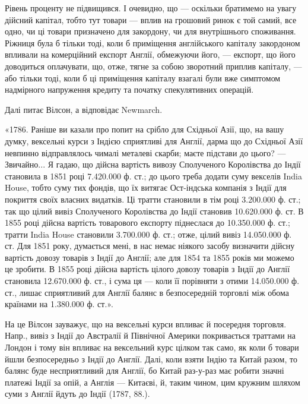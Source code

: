 \parcont{}  %
Рівень проценту не підвищився. І очевидно, що — оскільки братимемо на увагу
дійсний капітал, тобто тут товари — вплив на грошовий ринок є той самий,
все одно, чи ці товари призначено для закордону, чи для внутрішнього споживання.
Ріжниця була б тільки тоді, коли б приміщення англійського капіталу
закордоном впливали на комерційний експорт Англії, обмежуючи його, — експорт,
що його доводиться оплачувати, що, отже, тягне за собою зворотний приплив
капіталу, — або тільки тоді, коли б ці приміщення капіталу взагалі були вже
симптомом надмірного напруження кредиту та початку спекулятивних операцій.

Далі питає Вілсон, а відповідає Newmarch.

«1786. Раніше ви казали про попит на срібло для Східньої Азії, що, на
вашу думку, вексельні курси з Індією сприятливі для Англії, дарма що до Східньої
Азії невпинно відправлялось чималі металеві скарби; маєте підстави до цього? —
Звичайно... Я гадаю, що дійсна вартість вивозу Сполученого Королівства до
Індії становила в 1851 році 7.420.000 ф. ст.; до цього треба додати суму
векселів India House, тобто суму тих фондів, що їх витягає Ост-індська компанія
з Індії для покриття своїх власних видатків. Ці тратти становили в тім році
3.200.000 ф. ст.; так що цілий вивіз Сполученого Королівства до Індії становив
10.620.000 ф. ст. В 1855 році дійсна вартість товарового експорту піднеслася
до 10.350.000 ф. ст.; тратти India House становили 3.700.000 ф. ст.;
отже, цілий вивіз 14.050.000 ф. ст. Для 1851 року, думається мені, в нас немає
ніякого засобу визначити дійсну вартість довозу товарів з Індії до Англії; але
для 1854 та 1855 років ми можемо це зробити. В 1855 році дійсна вартість
цілого довозу товарів з Індії до Англії становила 12.670.000 ф. ст., і сума ця —
коли її порівняти з отими 14.050.000 ф. ст., лишає сприятливий для Англії
балянс в безпосередній торговлі між обома країнами на 1.380.000 ф. ст.».

На це Вілсон зауважує, що на вексельні курси впливає й посередня торговля.
Напр., вивіз з Індії до Австралії й Північної Америки покривається траттами
на Лондон і тому він впливає на вексельний курс цілком так само, як
коли б товари йшли безпосередньо з Індії до Англії. Далі, коли взяти Індію та
Китай разом, то балянс буде несприятливий для Англії, бо Китай раз-у-раз
має робити значні платежі Індії за опій, а Англія — Китаєві, й, таким чином, цим
кружним шляхом суми з Англії йдуть до Індії (1787, 88.).


